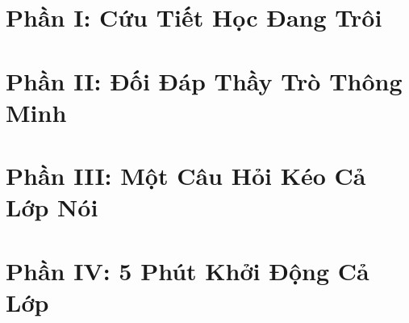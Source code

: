 \documentclass[11pt,a5paper,oneside,openany]{book}
\begin{document}
\frontmatter


\tableofcontents
\clearpage

\mainmatter
\part{Phần I: Cứu Tiết Học Đang Trôi}



\part{Phần II: Đối Đáp Thầy Trò Thông Minh}



\part{Phần III: Một Câu Hỏi Kéo Cả Lớp Nói}



\part{Phần IV: 5 Phút Khởi Động Cả Lớp}


\end{document}
